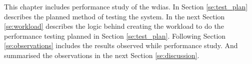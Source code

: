 
This chapter includes performance study of the \acrshort{wdias}. In Section \ref{se:test_plan} describes the planned method of testing the system.
In the next Section \ref{se:workload} describes the logic behind creating the workload to do the performance testing planned in Section \ref{se:test_plan}.
Following Section \ref{se:observations} includes the results observed while performance study. And summarised the observations in the next Section \ref{se:discussion}.
